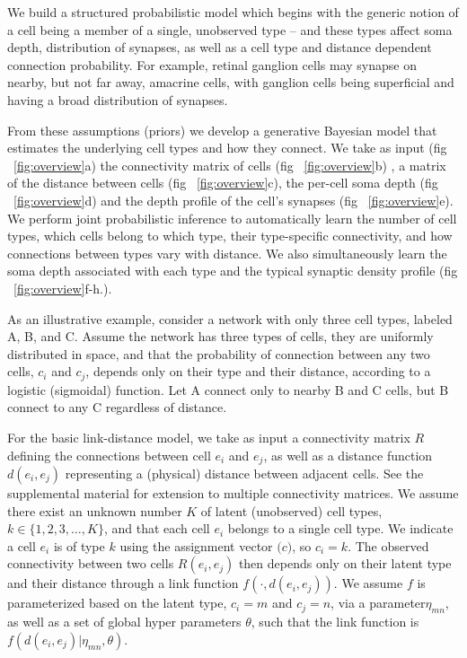 \documentclass{article}
\renewcommand{\vec}[1]{\mathbf{#1}}
\begin{document}
We build a structured probabilistic model which begins with the
generic notion of a cell being a member of a single, unobserved type
-- and these types affect soma depth, distribution of synapses, as
well as a cell type and distance dependent connection probability. For
example, retinal ganglion cells may synapse on nearby, but not far
away, amacrine cells, with ganglion cells being superficial and having
a broad distribution of synapses.  


From these assumptions (priors) we develop a generative Bayesian model
that estimates the underlying cell types and how they connect. We take
as input (fig ~\ref{fig:overview}a) the connectivity matrix of cells
(fig ~\ref{fig:overview}b) , a matrix of the distance between cells
(fig ~\ref{fig:overview}c), the per-cell soma depth (fig
~\ref{fig:overview}d) and the depth profile of the cell's synapses
(fig ~\ref{fig:overview}e). We perform joint probabilistic inference
to automatically learn the number of cell types, which cells belong to
which type, their type-specific connectivity, and how connections
between types vary with distance. We also simultaneously learn the
soma depth associated with each type and the typical synaptic density
profile (fig ~\ref{fig:overview}f-h.).


As an illustrative example, consider a network with only three cell
types, labeled A, B, and C. Assume the network has three types of
cells, they are uniformly distributed in space, and that the
probability of connection between any two cells, $c_i$ and $c_j$,
depends only on their type and their distance, according to a logistic
(sigmoidal) function. Let A connect only to nearby B and C cells, but B
connect to any C regardless of distance. 


For the basic link-distance model, we take as input a connectivity
matrix $R$ defining the connections between cell $e_i$ and $e_j$, as
well as a distance function $d(e_i, e_j)$ representing a (physical)
distance between adjacent cells.  See
the supplemental material for extension to multiple connectivity
matrices. We assume there exist an unknown number $K$ of latent
(unobserved) cell types, $k \in \{1, 2, 3, \dots, K\}$, and that each
cell $e_i$ belongs to a single cell type. We indicate a cell $e_i$ is
of type $k$ using the assignment vector $\vec(c)$, so $c_i = k$. The
observed connectivity between two cells $R(e_i, e_j)$ then depends
only on their latent type and their distance through a link function
$f(\cdot, d(e_i, e_j))$. We assume $f$ is parameterized based on the
latent type, $c_i=m$ and $c_j=n$, via a parameter$\eta_{mn}$, as well
as a set of global hyper parameters $\theta$, such that the link
function is $f(d(e_i, e_j) | \eta_{mn}, \theta)$.
\end{document}
